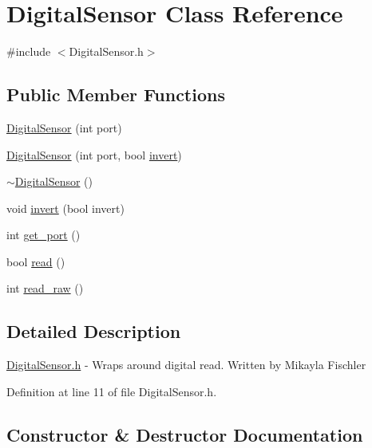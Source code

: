 \hypertarget{class_digital_sensor}{}\section{Digital\+Sensor Class Reference}
\label{class_digital_sensor}


{\ttfamily \#include $<$Digital\+Sensor.\+h$>$}

\subsection*{Public Member Functions}
\begin{DoxyCompactItemize}
\item 
\hyperlink{class_digital_sensor_a3b8daf63e0d82c25146c651cda0adc13}{Digital\+Sensor} (int port)
\item 
\hyperlink{class_digital_sensor_aaccd3ee6cb96375888f4d6ebe5ef47b4}{Digital\+Sensor} (int port, bool \hyperlink{class_digital_sensor_a1e6784022a127dd543bbfcc4f69c4802}{invert})
\item 
\hyperlink{class_digital_sensor_ab74d9e7e77b4ea505cd42a364017ded0}{$\sim$\+Digital\+Sensor} ()
\item 
void \hyperlink{class_digital_sensor_a1e6784022a127dd543bbfcc4f69c4802}{invert} (bool invert)
\item 
int \hyperlink{class_digital_sensor_a9957b8be49aaa4dc417db3ccbcdf3956}{get\+\_\+port} ()
\item 
bool \hyperlink{class_digital_sensor_a0b182fe8c229aaa0ea850889193f28f9}{read} ()
\item 
int \hyperlink{class_digital_sensor_a8cbcce6b1e7929c24ddf5992ec2c7537}{read\+\_\+raw} ()
\end{DoxyCompactItemize}


\subsection{Detailed Description}
\hyperlink{_digital_sensor_8h}{Digital\+Sensor.\+h} -\/ Wraps around digital read. Written by Mikayla Fischler 

Definition at line 11 of file Digital\+Sensor.\+h.



\subsection{Constructor \& Destructor Documentation}
\mbox{\label{class_digital_sensor_a3b8daf63e0d82c25146c651cda0adc13}} 
